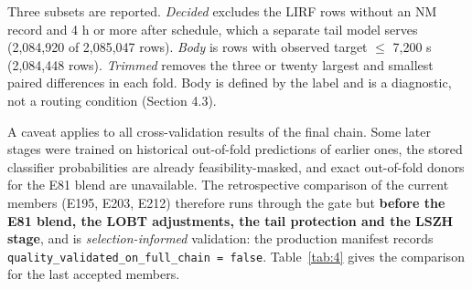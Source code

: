 \documentclass[
  manuscript=article,  %
  layout=preprint,     %
  year=2026,
  volume=4,
]{extra/joas}
\begin{document}
Three subsets are reported. \emph{Decided} excludes the LIRF rows without an NM record and 4 h or more after schedule, which a separate tail model serves (2,084,920 of 2,085,047 rows). \emph{Body} is rows with observed target $\le$ 7,200 s (2,084,448 rows). \emph{Trimmed} removes the three or twenty largest and smallest paired differences in each fold. Body is defined by the label and is a diagnostic, not a routing condition (Section 4.3).

A caveat applies to all cross-validation results of the final chain. Some later stages were trained on historical out-of-fold predictions of earlier ones, the stored classifier probabilities are already feasibility-masked, and exact out-of-fold donors for the E81 blend are unavailable. The retrospective comparison of the current members (E195, E203, E212) therefore runs through the gate but \textbf{before the E81 blend, the LOBT adjustments, the tail protection and the LSZH stage}, and is \emph{selection-informed} validation: the production manifest records \texttt{quality\_\allowbreak{}validated\_\allowbreak{}on\_\allowbreak{}full\_\allowbreak{}chain\ =\ false}. Table~\ref{tab:4} gives the comparison for the last accepted members.
\end{document}
